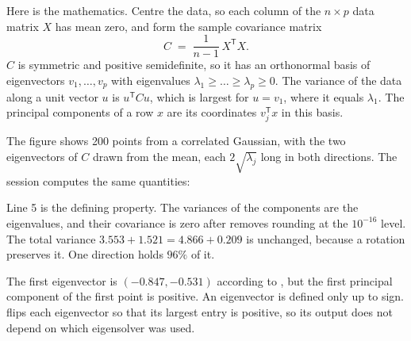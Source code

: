 Here is the mathematics. Centre the data, so each column of the \(n\times p\) data
matrix \(X\) has mean zero, and form the sample covariance matrix
\[
  C \;=\; \frac{1}{n-1}\, X^{\mathsf T} X .
\]
\(C\) is symmetric and positive semidefinite, so it has an orthonormal basis of
eigenvectors \(v_1, \dots, v_p\) with eigenvalues
\(\lambda_1 \ge \dots \ge \lambda_p \ge 0\). The variance of the data along a unit
vector \(u\) is \(u^{\mathsf T} C u\), which is largest for \(u = v_1\), where it
equals \(\lambda_1\). The principal components of a row \(x\) are its coordinates
\(v_j^{\mathsf T} x\) in this basis.


The figure shows 200 points from a correlated Gaussian, with the two eigenvectors
of \(C\) drawn from the mean, each \(2\sqrt{\lambda_j}\) long in both directions.
The session computes the same quantities:

\begin{codepairs}
\end{codepairs}

Line 5 is the defining property. The variances of the components are the
eigenvalues, and their covariance is zero after  removes rounding at the
\(10^{-16}\) level. The total variance \(3.553 + 1.521 = 4.866 + 0.209\) is
unchanged, because a rotation preserves it. One direction holds \(96\%\) of it.

The first eigenvector is \((-0.847, -0.531)\) according to , but
the first principal component of the first point is positive. An eigenvector is
defined only up to sign.  flips each eigenvector so that its
largest entry is positive, so its output does not depend on which eigensolver was
used.


